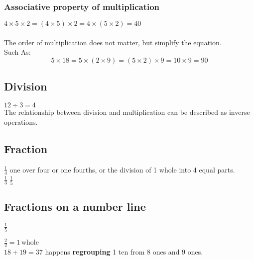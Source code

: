 \documentclass[10pt,a4paper]{article}
\begin{document}
\subsubsection{Associative property of multiplication}
$4 \times 5 \times 2 = \left(4 \times 5\right) \times 2 = 4 \times \left(5 \times 2\right) = 40$\\\\
The order of multiplication does not matter, but simplify the equation.\\
Such As:
$$5 \times 18 = 5 \times \left(2 \times 9\right) = \left(5 \times 2\right) \times 9 = 10 \times 9 = 90$$

\subsection{Division}
$12 \div 3 = 4$\\

The relationship between division and multiplication can be described as inverse operations. 

\subsection{Fraction}
$\frac{1}{4}$ one over four or one fourths, or the division of 1 whole into 4 equal parts.\\

$\frac{1}{3}$ $\frac{1}{5}$\\

\subsection{Fractions on a number line}

$\frac{1}{5}$\\


$\frac{2}{2} = 1\, \text{whole}$ \\

$18 + 19 = 37$ happens \textbf{regrouping} 1 ten from 8 ones and 9 ones.\\ 
\end{document}
